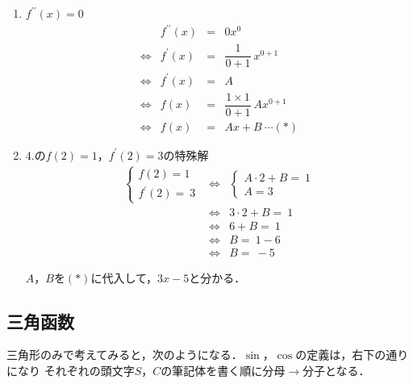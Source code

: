 \documentclass[a4paper,11pt]{ltjsarticle}
\begin{document}
\begin{enumerate}
  \item $f^{\prime \prime}(x)=0$
\begin{equation}
  \renewcommand{\arraystretch}{2}
  \begin{array}{rccl}
    & f^{\prime \prime}(x)
    &=&
    0x^{0}
    \\
    \Leftrightarrow
    &
    f^{\prime}(x)
    &=&
    \dfrac{1}{0+1}\ x^{0+1}
    \\
    \Leftrightarrow
    & f^{\prime}(x)
    &=&
    A
    \\
    \Leftrightarrow
    &
    f(x)
    &=&
    \dfrac{1 \times 1}{0+1}\ Ax^{0+1}
    \\
    \Leftrightarrow
    &
    f(x)
    &=&
    Ax+B\ \cdots (\ast)
  \end{array}
\end{equation}

\clearpage

  \item 4.の$f(2)=1$，$f^{\prime}(2)=3$の特殊解
\begin{equation}
  \renewcommand{\arraystretch}{2}
  \begin{array}{rcl}
    \begin{cases}
      f(2)=1 \\
      f^{\prime}(2)=\ 3
    \end{cases}
    &\Leftrightarrow&
    \begin{cases}
      A \cdot 2+B=\ 1 \\
      A=3
    \end{cases} \\
    &\Leftrightarrow&
    3 \cdot 2+B=\ 1
    \\
    &\Leftrightarrow&
    6+B=\ 1
    \\
    &\Leftrightarrow&
    B=\ 1-6
    \\
    &\Leftrightarrow&
    B=\ -5
  \end{array}
\end{equation}

\begin{center}
  $A$，$B$を$(\ast)$に代入して，$3x-5$と分かる．
\end{center}

\end{enumerate}

\subsection{三角函数}

三角形のみで考えてみると，次のようになる．$\sin$，$\cos$の定義は，右下の通りになり
それぞれの頭文字$S$，$C$の筆記体を書く順に分母$\rightarrow$分子となる．
\end{document}
